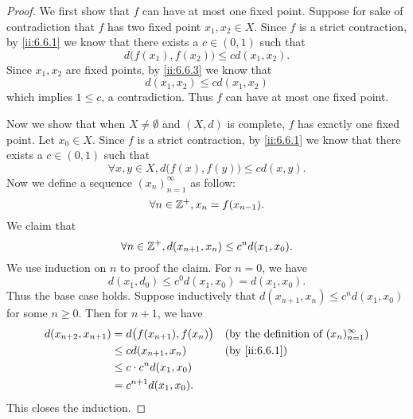 \begin{proof}
  We first show that \(f\) can have at most one fixed point.
  Suppose for sake of contradiction that \(f\) has two fixed point \(x_1, x_2 \in X\).
  Since \(f\) is a strict contraction, by \cref{ii:6.6.1} we know that there exists a \(c \in (0, 1)\) such that
  \[
    d\big(f(x_1), f(x_2)\big) \leq c d(x_1, x_2).
  \]
  Since \(x_1, x_2\) are fixed points, by \cref{ii:6.6.3} we know that
  \[
    d(x_1, x_2) \leq c d(x_1, x_2)
  \]
  which implies \(1 \leq c\), a contradiction.
  Thus \(f\) can have at most one fixed point.

  Now we show that when \(X \neq \emptyset\) and \((X, d)\) is complete, \(f\) has exactly one fixed point.
  Let \(x_0 \in X\).
  Since \(f\) is a strict contraction, by \cref{ii:6.6.1} we know that there exists a \(c \in (0, 1)\) such that
  \[
    \forall x, y \in X, d\big(f(x), f(y)\big) \leq c d(x, y).
  \]
  Now we define a sequence \((x_n)_{n = 1}^\infty\) as follow:
  \[
    \forall n \in \mathbb{Z}^+, x_n = f(x_{n - 1}).
  \]
  We claim that
  \[
    \forall n \in \mathbb{Z}^+, d(x_{n + 1}, x_n) \leq c^n d(x_1, x_0).
  \]
  We use induction on \(n\) to proof the claim.
  For \(n = 0\), we have
  \[
    d(x_1, d_0) \leq c^0 d(x_1, x_0) = d(x_1, x_0).
  \]
  Thus the base case holds.
  Suppose inductively that \(d(x_{n + 1}, x_n) \leq c^n d(x_1, x_0)\) for some \(n \geq 0\).
  Then for \(n + 1\), we have
  \begin{align*}
    d(x_{n + 2}, x_{n + 1}) & = d\big(f(x_{n + 1}), f(x_n)\big) &  & \text{(by the definition of \((x_n)_{n = 1}^\infty\))} \\
                            & \leq c d(x_{n + 1}, x_n)          &  & \by{ii:6.6.1}                                          \\
                            & \leq c \cdot c^n d(x_1, x_0)                                                                  \\
                            & = c^{n + 1} d(x_1, x_0).
  \end{align*}
  This closes the induction.


\end{proof}
